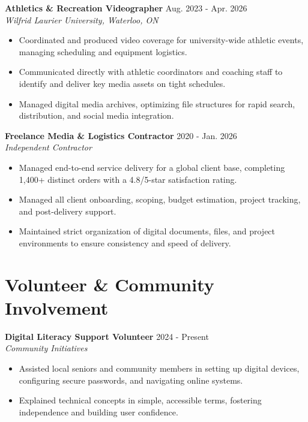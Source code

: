 \documentclass[a4paper,10pt]{article}
\begin{document}
\vspace{3pt}
\textbf{Athletics \& Recreation Videographer} \hfill Aug. 2023 - Apr. 2026 \\
\textit{Wilfrid Laurier University, Waterloo, ON}
\begin{itemize}
    \item Coordinated and produced video coverage for university-wide athletic events, managing scheduling and equipment logistics.
    \item Communicated directly with athletic coordinators and coaching staff to identify and deliver key media assets on tight schedules.
    \item Managed digital media archives, optimizing file structures for rapid search, distribution, and social media integration.
\end{itemize}

\vspace{3pt}
\textbf{Freelance Media \& Logistics Contractor} \hfill 2020 - Jan. 2026 \\
\textit{Independent Contractor}
\begin{itemize}
    \item Managed end-to-end service delivery for a global client base, completing 1,400+ distinct orders with a 4.8/5-star satisfaction rating.
    \item Managed all client onboarding, scoping, budget estimation, project tracking, and post-delivery support.
    \item Maintained strict organization of digital documents, files, and project environments to ensure consistency and speed of delivery.
\end{itemize}

\section*{Volunteer \& Community Involvement}
\textbf{Digital Literacy Support Volunteer} \hfill 2024 - Present \\
\textit{Community Initiatives}
\begin{itemize}
    \item Assisted local seniors and community members in setting up digital devices, configuring secure passwords, and navigating online systems.
    \item Explained technical concepts in simple, accessible terms, fostering independence and building user confidence.
\end{itemize}
\end{document}
